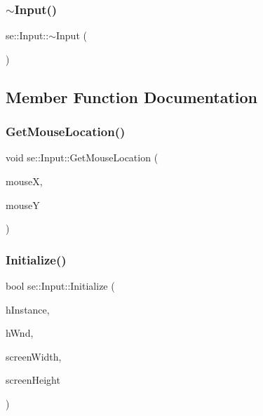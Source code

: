 \mbox{\label{classse_1_1_input_ad856d30ccdab1d654eb59b0895ade26c}} 
\subsubsection{\texorpdfstring{$\sim$\+Input()}{~Input()}}
{\footnotesize\ttfamily se\+::\+Input\+::$\sim$\+Input (\begin{DoxyParamCaption}{ }\end{DoxyParamCaption})}



\subsection{Member Function Documentation}
\mbox{\label{classse_1_1_input_a6088639b8f77563aad712a7c9708edf1}} 
\subsubsection{\texorpdfstring{Get\+Mouse\+Location()}{GetMouseLocation()}}
{\footnotesize\ttfamily void se\+::\+Input\+::\+Get\+Mouse\+Location (\begin{DoxyParamCaption}\item[{int \&}]{mouseX,  }\item[{int \&}]{mouseY }\end{DoxyParamCaption})}

\mbox{\label{classse_1_1_input_a3f76e2bdfbd322766cc08a9ddda9727a}} 
\subsubsection{\texorpdfstring{Initialize()}{Initialize()}}
{\footnotesize\ttfamily bool se\+::\+Input\+::\+Initialize (\begin{DoxyParamCaption}\item[{H\+I\+N\+S\+T\+A\+N\+CE}]{h\+Instance,  }\item[{H\+W\+ND}]{h\+Wnd,  }\item[{int}]{screen\+Width,  }\item[{int}]{screen\+Height }\end{DoxyParamCaption})}

